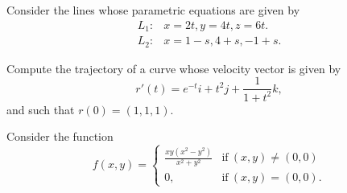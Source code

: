 \documentclass[11pt]{exam}
\begin{document}
\begin{questions}
\newpage 


\addpoints 
\question Consider the lines whose parametric equations are given by 
\begin{align*}
L_1 \colon  & x=2t, y=4t, z=6t.\\
L_2 \colon & x=1-s, 4+s, -1+s.
\end{align*}


\newpage

\addpoints
\question[10] Compute the trajectory of a curve whose velocity vector is given by 
\begin{equation*}
r'(t)= e^{-t}i + t^2j + \frac{1}{1+t^2} k,
\end{equation*}
and such that $r(0)=(1,1,1)$. 
\newpage

\addpoints

\addpoints
\question Consider the function
\begin{equation*}
f(x,y)=\left\{
\begin{array}{rc}
\frac{xy(x^2-y^2)}{x^2+y^2} & \mbox{if} \ (x,y) \neq (0,0)\\
0, & \mbox{if} \ (x,y)=(0,0).
\end{array}
\right.
\end{equation*}

\end{questions}
\end{document}
